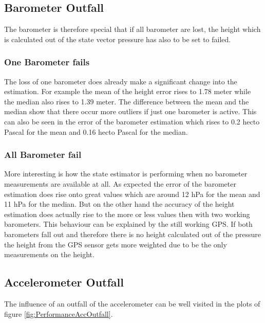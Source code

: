 \subsection{Barometer Outfall}
The barometer is therefore special that if all barometer are lost, 
the height which is calculated out of the state vector pressure has also to be set to failed.

\subsubsection{One Barometer fails}
The loss of one barometer does already make a significant change into the estimation.
For example the mean of the height error rises to 1.78 meter while the median also rises to 1.39 meter.
The difference between the mean and the median show that there occur more outliers if just one barometer is active.
This can also be seen in the error of the barometer estimation which rises to 0.2 hecto Pascal for the mean and 0.16 hecto Pascal for the median.

\subsubsection{All Barometer fail}
More interesting is how the state estimator is performing when no barometer measurements are available at all.
As expected the error of the barometer estimation does rise onto great values which are around 12 hPa for the mean and 11 hPa for the median.
But on the other hand the accuracy of the height estimation does actually rise to the more or less values then with two working barometers.
This behaviour can be explained by the still working GPS.
If both barometers fall out and therefore there is no height calculated out of the pressure the height from the 
GPS sensor gets more weighted due to be the only measurements on the height.

\newpage
\subsection{Accelerometer Outfall}
The influence of an outfall of the accelerometer can be well visited in the plots of figure \ref{fig:PerformanceAccOutfall}.

